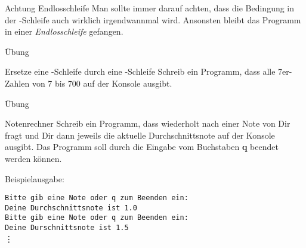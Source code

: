 \begin{frame}
\begin{alertblock}{Achtung Endlosschleife}
	\vspace{2pt}
	Man sollte immer darauf achten, dass die Bedingung in der -Schleife auch wirklich irgendwannmal  wird. Ansonsten bleibt das Programm in einer \emph{Endlosschleife} gefangen. 
\end{alertblock}
\end{frame}

\begin{frame}{Übung}

\begin{block}{Ersetze eine -Schleife durch eine -Schleife}
\vspace{2pt}
Schreib ein Programm, dass alle 7er-Zahlen von 7 bis 700 auf der Konsole ausgibt.  
\end{block}







\end{frame}

\begin{frame}{Übung}

\begin{block}{Notenrechner}
\vspace{2pt}
Schreib ein Programm, dass wiederholt nach einer Note von Dir fragt und Dir dann jeweils die aktuelle Durchschnittsnote auf der Konsole ausgibt. 
Das Programm soll durch die Eingabe vom Buchstaben \textbf{q} beendet werden können. 

Beispielausgabe: 

\texttt{Bitte gib eine Note oder q zum Beenden ein:}  \\
\texttt{Deine Durchschnittsnote ist 1.0} \\
\texttt{Bitte gib eine Note oder q zum Beenden ein:}  \\
\texttt{Deine Durschnittsnote ist 1.5} \\
\phantom{Code} \vdots 
	
\end{block}

\end{frame}

